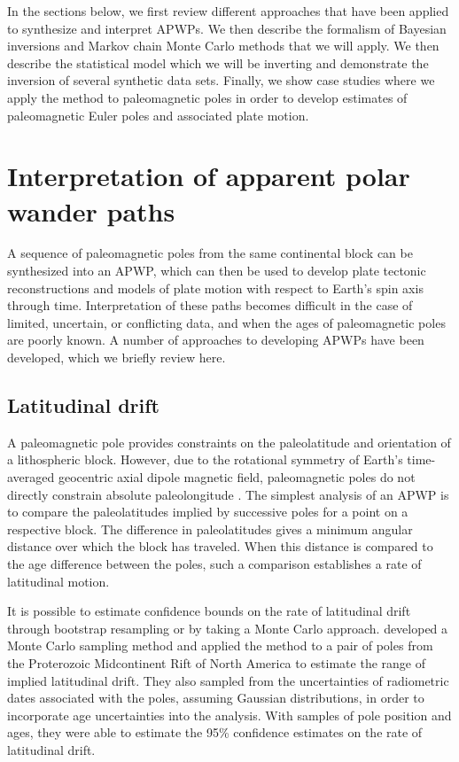 \documentclass[11pt,letterpaper]{article}
\begin{document}
In the sections below, we first review different approaches that have been applied to synthesize and interpret APWPs. We then describe the formalism of Bayesian inversions and Markov chain Monte Carlo methods that we will apply. We then describe the statistical model which we will be inverting and demonstrate the inversion of several synthetic data sets. Finally, we show case studies where we apply the method to paleomagnetic poles in order to develop estimates of paleomagnetic Euler poles and associated plate motion.

\section*{Interpretation of apparent polar wander paths}

A sequence of paleomagnetic poles from the same continental block can be synthesized into an APWP, which can then be used to develop plate tectonic reconstructions and models of plate motion with respect to Earth's spin axis through time. Interpretation of these paths becomes difficult in the case of limited, uncertain, or conflicting data, and when the ages of paleomagnetic poles are poorly known. A number of approaches to developing APWPs have been developed, which we briefly review here.

\subsection*{Latitudinal drift}
A paleomagnetic pole provides constraints on the paleolatitude and orientation of a lithospheric block. However, due to the rotational symmetry of Earth's time-averaged geocentric axial dipole magnetic field, paleomagnetic poles do not directly constrain absolute paleolongitude \citep{Butler1992a}. The simplest analysis of an APWP is to compare the paleolatitudes implied by successive poles for a point on a respective block. The difference in paleolatitudes gives a minimum angular distance over which the block has traveled. When this distance is compared to the age difference between the poles, such a comparison establishes a rate of latitudinal motion.

It is possible to estimate confidence bounds on the rate of latitudinal drift through bootstrap resampling \citep[e.g.][]{Tarduno1990b} or by taking a Monte Carlo approach. \cite{Swanson-Hysell2014b} developed a Monte Carlo sampling method and applied the method to a pair of poles from the Proterozoic Midcontinent Rift of North America to estimate the range of implied latitudinal drift. They also sampled from the uncertainties of radiometric dates associated with the poles, assuming Gaussian distributions, in order to incorporate age uncertainties into the analysis. With samples of pole position and ages, they were able to estimate the 95\% confidence estimates on the rate of latitudinal drift.
\end{document}
